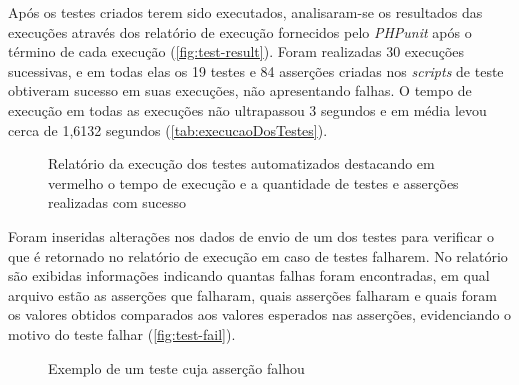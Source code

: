     Após os testes criados terem sido executados, analisaram-se os resultados das execuções através dos relatório de execução fornecidos pelo \emph{PHPunit} após o término de cada execução (\autoref{fig:test-result}). Foram realizadas 30 execuções sucessivas, e em todas elas os 19 testes e 84 asserções criadas nos \emph{scripts} de teste obtiveram sucesso em suas execuções, não apresentando falhas. O tempo de execução em todas as execuções não ultrapassou 3 segundos e em média levou cerca de 1,6132 segundos (\autoref{tab:execucaoDosTestes}).
    
    \begin{figure}[!htb]
        \centering
        \begin{minipage}{\wd0}
	        \caption{Relatório da execução dos testes automatizados destacando em vermelho o tempo de execução e a quantidade de testes e asserções realizadas com sucesso}
	        \label{fig:test-result}
        \end{minipage}
    \end{figure}
    
    

    
    Foram inseridas alterações nos dados de envio de um dos testes para verificar o que é retornado no relatório de execução em caso de testes falharem. No relatório são exibidas informações indicando quantas falhas foram encontradas, em qual arquivo estão as asserções que falharam, quais asserções falharam e quais foram os valores obtidos comparados aos valores esperados nas asserções, evidenciando o motivo do teste falhar (\autoref{fig:test-fail}).
    
    \begin{figure}[!htb]
        \centering
        \begin{minipage}{\wd0}
	        \caption{Exemplo de um teste cuja asserção falhou}
	        \label{fig:test-fail}
	    \end{minipage}
    \end{figure}
        
